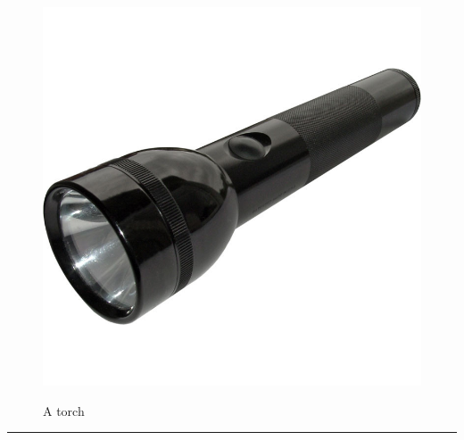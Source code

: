 \documentclass{article}
\begin{document}
    \begin{figure}[H]
        \centering
        \begin{minipage}{0.25\textwidth}
            \centering
            \includegraphics[width=\textwidth]{../SurvivalItemImages/torch}
        \end{minipage}\hfill
        \begin{minipage}{0.7\textwidth}
            \centering
            \Large A torch
        \end{minipage}
    \end{figure}
    \vspace{-0.8em}
    \noindent\rule{\textwidth}{0.4pt}
            
\end{document}
